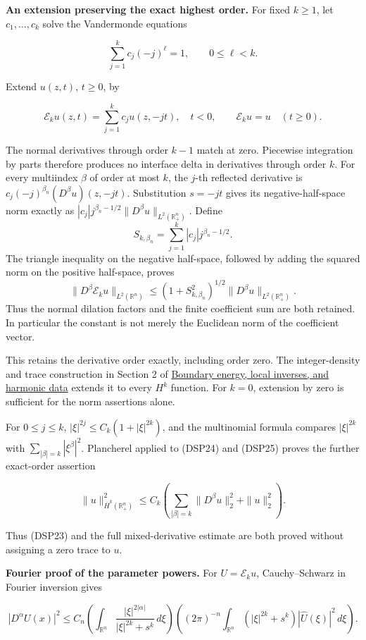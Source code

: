 \documentclass[
  11pt,
]{article}
\begin{document}
\textbf{An extension preserving the exact highest order.} For fixed
\(k\geq1\), let \(c_1,\ldots,c_k\) solve the Vandermonde equations

\[
 \sum_{j=1}^kc_j(-j)^\ell=1,\qquad0\leq\ell<k.
\]

Extend \(u(z,t)\), \(t\geq0\), by

\[
 \mathcal E_ku(z,t)=\sum_{j=1}^kc_ju(z,-jt),\quad t<0,
 \qquad \mathcal E_ku=u\quad(t\geq0).
 \tag{DSP24}
\]

The normal derivatives through order \(k-1\) match at zero. Piecewise
integration by parts therefore produces no interface delta in
derivatives through order \(k\). For every multiindex \(\beta\) of order
at most \(k\), the \(j\)-th reflected derivative is
\(c_j(-j)^{\beta_n}(D^\beta u)(z,-jt)\). Substitution \(s=-jt\) gives
its negative-half-space norm exactly as
\(|c_j|j^{\beta_n-1/2}\|D^\beta u\|_{L^2(\mathbb R^n_+)}\). Define \[
 S_{k,\beta_n}=\sum_{j=1}^k|c_j|j^{\beta_n-1/2}.
\] The triangle inequality on the negative half-space, followed by
adding the squared norm on the positive half-space, proves \[
 \|D^\beta\mathcal E_ku\|_{L^2(\mathbb R^n)}
 \leq (1+S_{k,\beta_n}^2)^{1/2}
                  \|D^\beta u\|_{L^2(\mathbb R^n_+)}.
 \tag{DSP25}
\] Thus the normal dilation factors and the finite coefficient sum are
both retained. In particular the constant is not merely the Euclidean
norm of the coefficient vector.

This retains the derivative order exactly, including order zero. The
integer-density and trace construction in Section 2 of
\href{second-order-boundary.pdf}{Boundary energy, local inverses, and
harmonic data} extends it to every \(H^k\) function. For \(k=0\),
extension by zero is sufficient for the norm assertions alone.

For \(0\leq j\leq k\), \(|\xi|^{2j}\leq C_k(1+|\xi|^{2k})\), and the
multinomial formula compares \(|\xi|^{2k}\) with
\(\sum_{|\beta|=k}|\xi^\beta|^2\). Plancherel applied to (DSP24) and
(DSP25) proves the further exact-order assertion

\[
 \|u\|_{\overline H^k(\mathbb R^n_+)}^2
 \leq C_k\left(\sum_{|\beta|=k}\|D^\beta u\|_2^2+\|u\|_2^2\right).
 \tag{DSP26}
\]

Thus (DSP23) and the full mixed-derivative estimate are both proved
without assigning a zero trace to \(u\).

\textbf{Fourier proof of the parameter powers.} For \(U=\mathcal E_ku\),
Cauchy--Schwarz in Fourier inversion gives

\[
 |D^\alpha U(x)|^2\leq C_n\left(\int_{\mathbb R^n}
 \frac{|\xi|^{2|\alpha|}}{|\xi|^{2k}+s^k}\,d\xi\right)
 \left((2\pi)^{-n}\int_{\mathbb R^n}(|\xi|^{2k}+s^k)|\widehat U(\xi)|^2\,d\xi\right).
 \tag{DSP27}
\]
\end{document}
